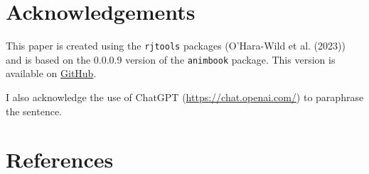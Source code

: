 \hypertarget{acknowledgements}{%
\section*{Acknowledgements}\label{acknowledgements}}

This paper is created using the \texttt{rjtools} packages (O'Hara-Wild et al. (2023)) and is based on the 0.0.0.9 version of the \texttt{animbook} package. This version is available on \href{https://github.com/KrisanatA/animbook}{GitHub}.

I also acknowledge the use of ChatGPT (\url{https://chat.openai.com/}) to paraphrase the sentence.

\hypertarget{references}{%
\section*{References}\label{references}}

